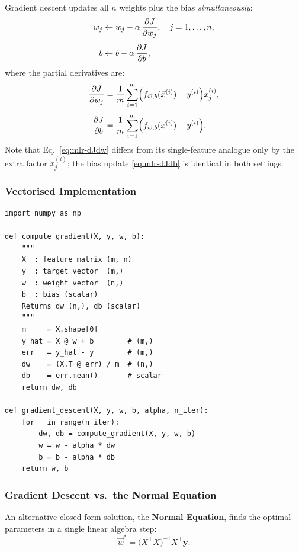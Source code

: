 Gradient descent updates all $n$ weights plus the bias \emph{simultaneously}:
\begin{align}
w_j &\leftarrow w_j-\alpha\,\dfrac{\partial J}{\partial w_j},\quad j=1,\ldots,n,\label{eq:mlr-gd-w}\\[4pt]
b   &\leftarrow b-\alpha\,\dfrac{\partial J}{\partial b},\label{eq:mlr-gd-b}
\end{align}
where the partial derivatives are:
\begin{align}
\dfrac{\partial J}{\partial w_j} &= \frac{1}{m}\sum_{i=1}^m
  \Bigl(f_{\vec{w},b}(\vec{x}^{(i)})-y^{(i)}\Bigr)x_j^{(i)},\label{eq:mlr-dJdw}\\[4pt]
\dfrac{\partial J}{\partial b}   &= \frac{1}{m}\sum_{i=1}^m
  \Bigl(f_{\vec{w},b}(\vec{x}^{(i)})-y^{(i)}\Bigr).\label{eq:mlr-dJdb}
\end{align}
Note that Eq.~\eqref{eq:mlr-dJdw} differs from its single-feature analogue
only by the extra factor $x_j^{(i)}$; the bias update \eqref{eq:mlr-dJdb}
is identical in both settings.

\subsubsection{Vectorised Implementation}

\begin{lstlisting}[caption={Vectorised gradient descent for multiple linear regression}]
import numpy as np

def compute_gradient(X, y, w, b):
    """
    X  : feature matrix (m, n)
    y  : target vector  (m,)
    w  : weight vector  (n,)
    b  : bias (scalar)
    Returns dw (n,), db (scalar)
    """
    m     = X.shape[0]
    y_hat = X @ w + b        # (m,)
    err   = y_hat - y        # (m,)
    dw    = (X.T @ err) / m  # (n,)
    db    = err.mean()       # scalar
    return dw, db

def gradient_descent(X, y, w, b, alpha, n_iter):
    for _ in range(n_iter):
        dw, db = compute_gradient(X, y, w, b)
        w = w - alpha * dw
        b = b - alpha * db
    return w, b
\end{lstlisting}

\subsubsection{Gradient Descent vs.\ the Normal Equation}

An alternative closed-form solution, the \textbf{Normal Equation}, finds the
optimal parameters in a single linear algebra step:
\[
\vec{w}^*=\bigl(X^{\top}X\bigr)^{-1}X^{\top}\mathbf{y}.
\]

